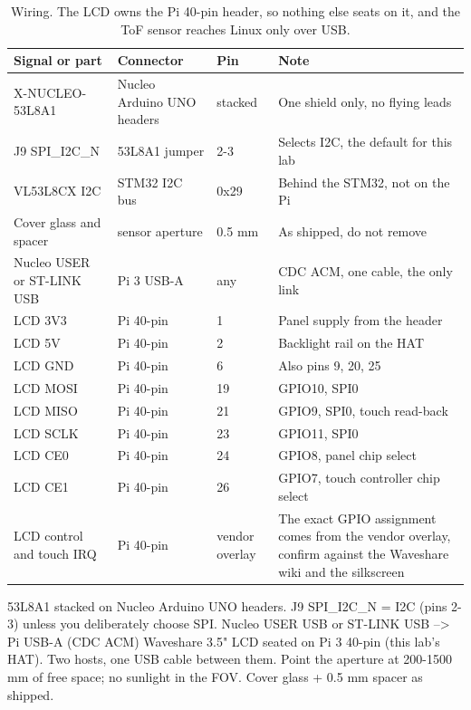 \begin{table}[H]\centering\small
\begin{tabular}{p{40mm}p{30mm}p{20mm}p{58mm}}
\toprule
Signal or part & Connector & Pin & Note \\
\midrule
X-NUCLEO-53L8A1 & Nucleo Arduino UNO headers & stacked & One shield only, no flying leads \\
J9 SPI\_I2C\_N & 53L8A1 jumper & 2-3 & Selects I2C, the default for this lab \\
VL53L8CX I2C & STM32 I2C bus & 0x29 & Behind the STM32, not on the Pi \\
Cover glass and spacer & sensor aperture & 0.5 mm & As shipped, do not remove \\
Nucleo USER or ST-LINK USB & Pi 3 USB-A & any & CDC ACM, one cable, the only link \\
LCD 3V3 & Pi 40-pin & 1 & Panel supply from the header \\
LCD 5V & Pi 40-pin & 2 & Backlight rail on the HAT \\
LCD GND & Pi 40-pin & 6 & Also pins 9, 20, 25 \\
LCD MOSI & Pi 40-pin & 19 & GPIO10, SPI0 \\
LCD MISO & Pi 40-pin & 21 & GPIO9, SPI0, touch read-back \\
LCD SCLK & Pi 40-pin & 23 & GPIO11, SPI0 \\
LCD CE0 & Pi 40-pin & 24 & GPIO8, panel chip select \\
LCD CE1 & Pi 40-pin & 26 & GPIO7, touch controller chip select \\
LCD control and touch IRQ & Pi 40-pin & vendor overlay & The exact GPIO assignment comes
from the vendor overlay, confirm against the Waveshare wiki and the silkscreen \\
\bottomrule
\end{tabular}
\caption{Wiring. The LCD owns the Pi 40-pin header, so nothing else seats on it, and the
ToF sensor reaches Linux only over USB.}
\end{table}

\begin{asciiart}
53L8A1 stacked on Nucleo Arduino UNO headers.
J9 SPI_I2C_N = I2C (pins 2-3) unless you deliberately choose SPI.
Nucleo USER USB or ST-LINK USB --> Pi USB-A   (CDC ACM)
Waveshare 3.5" LCD seated on Pi 3 40-pin (this lab's HAT).
Two hosts, one USB cable between them.
Point the aperture at 200-1500 mm of free space; no sunlight in the FOV.
Cover glass + 0.5 mm spacer as shipped.
\end{asciiart}

